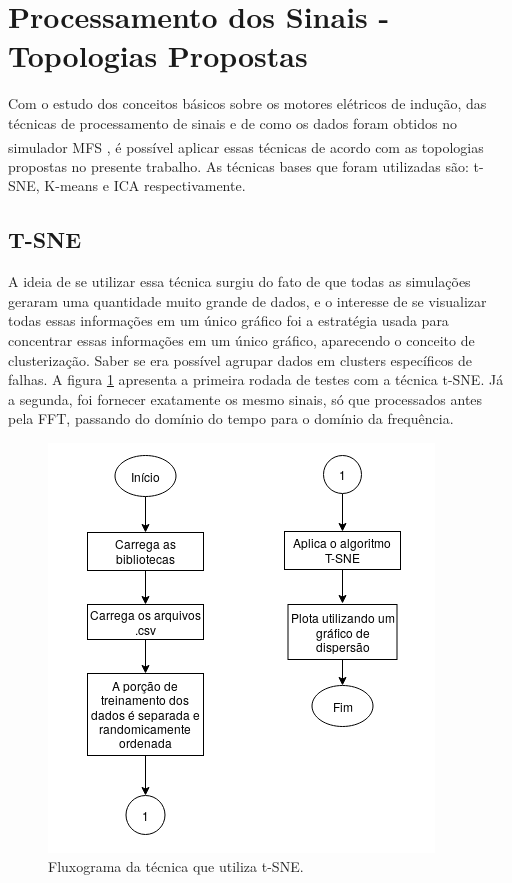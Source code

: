 % 

\section{Processamento dos Sinais - Topologias Propostas}

Com o estudo dos conceitos básicos sobre os motores elétricos de indução, das técnicas de processamento de sinais e de como os dados foram
obtidos no simulador MFS \textsuperscript \textregistered, é possível aplicar essas técnicas de acordo com as topologias propostas no presente trabalho. As técnicas
bases que foram utilizadas são: t-SNE, K-means e ICA respectivamente.


%  

\subsection{T-SNE}

A ideia de se utilizar essa técnica surgiu do fato de que todas as simulações geraram uma quantidade muito grande de dados, e o interesse
de se visualizar todas essas informações em um único gráfico foi a estratégia usada para concentrar essas informações em um único 
gráfico, aparecendo o conceito de clusterização. Saber se era possível agrupar dados em clusters específicos de falhas. A figura 
\ref{fig:t-sne} apresenta a primeira rodada de testes com a técnica t-SNE. Já a segunda, foi fornecer exatamente os mesmo sinais, só que
processados antes pela FFT, passando do domínio do tempo para o domínio da frequência.

\begin{figure}[H]
    \caption{Fluxograma da técnica que utiliza t-SNE.}
    \begin{center}
        \includegraphics[scale=.65]{metodologia/img/t-sne.png}
    \end{center}
    \label{fig:t-sne}
\end{figure}

